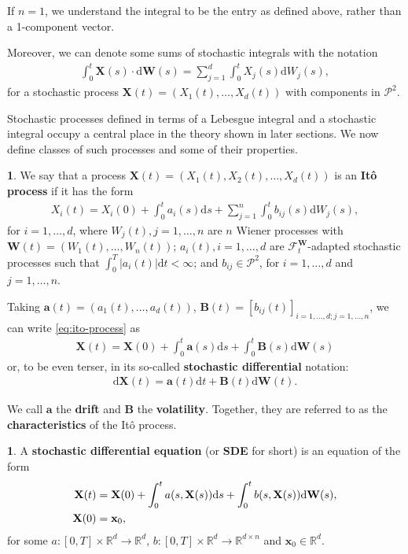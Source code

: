 \documentclass[english]{article}
\numberwithin{equation}{section}
\numberwithin{figure}{section}
\theoremstyle{bolddescit}
\theoremstyle{definition}
\newtheorem{definition}[theorem]{\protect\definitionname}
\theoremstyle{definition}
\theoremstyle{plain}
\theoremstyle{plain}
\theoremstyle{bolddesc}
\theoremstyle{plain}
\theoremstyle{remark}
\providecommand{\definitionname}{Definition}
\begin{document}
If $n=1$, we understand the integral to be the entry as defined above, rather than a 1-component vector.

Moreover, we can denote some sums of stochastic integrals with the notation
\begin{align*}
  \int_0^t \mathbf{X}(s) \cdot \mathrm{d}\mathbf{W}(s) = \sum_{j=1}^{d} \int_0^t X_j(s) \mathrm{d}W_j(s),
\end{align*}
for a stochastic process $\mathbf{X}(t) = (X_1(t), \ldots, X_d(t))$ with components in $\mathcal{P}^2$.

Stochastic processes defined in terms of a Lebesgue integral and a stochastic integral occupy a central place in the theory shown in later sections. We now define classes of such processes and some of their properties.

\begin{definition}
  We say that a process $\mathbf{X}(t) = (X_1(t), X_2(t), \ldots, X_d(t))$ is an \textbf{It\^o process} if it has the form
  \begin{align}\label{eq:ito-process}
    X_i(t) = X_i(0) + \int_0^t a_i(s) \mathrm{d}s + \sum_{j=1}^n \int_0^t b_{ij}(s) \mathrm{d}W_j(s),
  \end{align}
  for $i=1,\ldots,d$, where $W_j(t), j=1,\ldots,n$ are $n$ Wiener processes with $\mathbf{W}(t) = (W_1(t),\ldots,W_n(t))$; $a_i(t), i=1,\ldots,d$ are $\mathcal{F}^\mathbf{W}_t$-adapted stochastic processes such that $\int_0^T |a_i(t)| \mathrm{d}t < \infty$; and $b_{ij} \in \mathcal{P}^2$, for $i=1,\ldots,d$ and $j=1,\ldots,n$.
\end{definition}

Taking $\mathbf{a}(t) = (a_1(t),\ldots,a_d(t))$, $\mathbf{B}(t) = [b_{ij}(t)]_{i=1,\ldots,d;j=1,\ldots,n}$, we can write \eqref{eq:ito-process} as
\begin{align*}
  \mathbf{X}(t) = \mathbf{X}(0) + \int_0^t \mathbf{a}(s) \mathrm{d}s + \int_0^t \mathbf{B}(s) \mathrm{d}\mathbf{W}(s)
\end{align*}
or, to be even terser, in its so-called \textbf{stochastic differential} notation:
\begin{align*}
  \mathrm{d}\mathbf{X}(t) = \mathbf{a}(t) \mathrm{d}t + \mathbf{B}(t) \mathrm{d}\mathbf{W}(t).
\end{align*}

We call $\mathbf{a}$ the \textbf{drift} and $\mathbf{B}$ the \textbf{volatility}. Together, they are referred to as the \textbf{characteristics} of the It\^o process.

\begin{definition}
  A \textbf{stochastic differential equation} (or \textbf{SDE} for short) is an equation of the form
  \begin{align}\label{eq:sde-init-value}
    \mathbf{X}(t) &= \mathbf{X}(0) + \int_0^t a(s, \mathbf{X}(s)) \mathrm{d}s + \int_0^t b(s, \mathbf{X}(s)) \mathrm{d}\mathbf{W}(s),\\
    \mathbf{X}(0) &= \mathbf{x}_0,\notag
  \end{align}
  for some $a : [0,T] \times \mathbb{R}^{d} \to \mathbb{R}^d$, $b : [0,T] \times \mathbb{R}^{d} \to \mathbb{R}^{d \times n}$ and $\mathbf{x}_0 \in \mathbb{R}^d$.
\end{definition}
\end{document}
